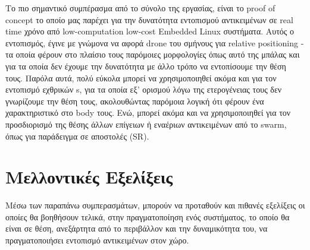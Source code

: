 Το πιο σημαντικό συμπέρασμα από το σύνολο της εργασίας, είναι το proof of concept το οποίο μας παρέχει για την δυνατότητα εντοπισμού αντικειμένων σε real time χρόνο από low-computation low-cost Embedded Linux συστήματα. Αυτός ο εντοπισμός, έγινε με γνώμονα να αφορά drone του σμήνους για relative positioning - τα οποία φέρουν στο πλαίσιο τους παρόμοιες μορφολογίες όπως αυτό της μπάλας και για τα οποία δεν έχουμε την δυνατότητα με άλλο τρόπο να εντοπίσουμε την θέση τους. Παρόλα αυτά, πολύ εύκολα μπορεί να χρησιμοποιηθεί ακόμα και για τον εντοπισμό εχθρικών s, για τα οποία εξ' ορισμού λόγω της ετερογένειας τους δεν γνωρίζουμε την θέση τους, ακολουθώντας παρόμοια λογική ότι φέρουν ένα χαρακτηριστικό στο body τους. Ενώ, μπορεί ακόμα και να χρησιμοποιηθεί για τον προσδιορισμό της θέσης άλλων επίγειων ή εναέριων αντικειμένων από το swarm, όπως για παράδειγμα σε αποστολές (SR).  

\section{Μελλοντικές Εξελίξεις}
Μέσω των παραπάνω συμπερασμάτων, μπορούν να προταθούν και πιθανές εξελίξεις οι οποίες θα βοηθήσουν τελικά, στην πραγματοποίηση ενός συστήματος, το οποίο θα είναι σε θέση, ανεξάρτητα από το περιβάλλον και την δυναμικότητα του, να πρα\-γμα\-το\-ποιή\-σει εντοπισμό αντικειμένων στον χώρο. 

